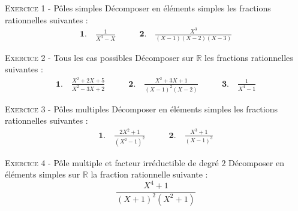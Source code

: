 \documentclass[11pt]{article}
\begin{document}
 

\begin{center}\textsc{{\huge }}\end{center}



\vskip0.3cm\noindent\textsc{Exercice 1} - Pôles simples
\vskip0.2cm
Décomposer en éléments simples les fractions rationnelles suivantes : 
$$\begin{array}{lll}
\displaystyle\mathbf{1.}\quad\frac{1}{X^3-X}&\quad\quad\mathbf{2.}\quad  \displaystyle \frac{X^3}{(X-1)(X-2)(X-3)}
\end{array}$$




\vskip0.3cm\noindent\textsc{Exercice 2} - Tous les cas possibles
\vskip0.2cm
Décomposer sur $\mathbb R$ les fractions rationnelles suivantes :
$$\begin{array}{lll}
\displaystyle\mathbf{1.}\quad\frac{X^2+2X +5}{X^2-3X+2}&\quad\quad\mathbf{2.}\quad \displaystyle\frac{X^2+3X+1}{(X-1)^2(X-2)}&\quad\quad\mathbf{3.}\quad \displaystyle \frac 1{X^4-1}
\end{array}$$




\vskip0.3cm\noindent\textsc{Exercice 3} - Pôles multiples
\vskip0.2cm
Décomposer en éléments simples les fractions rationnelles suivantes : 
$$\begin{array}{lll}
\displaystyle\mathbf{1.}\quad\frac{2X^2+1}{(X^2-1)^2}&
\quad\quad\mathbf{2.}\quad\displaystyle\frac{X^3+1}{(X-1)^3}
\end{array}$$




\vskip0.3cm\noindent\textsc{Exercice 4} - Pôle multiple et facteur irréductible de degré $2$
\vskip0.2cm
Décomposer en éléments simples sur $\mathbb R$ la fraction rationnelle suivante : 
$$\frac{X^4+1}{(X+1)^2(X^2+1)}$$




\vskip0.5cm

\end{document}
